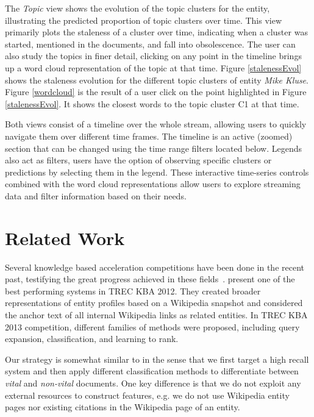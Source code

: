 \documentclass{article}
\begin{document}
The \emph{Topic} view shows the evolution of the topic clusters for the entity, illustrating the predicted proportion of topic clusters over time.
This view primarily plots the staleness of a cluster over time, indicating when a cluster was started, mentioned in the documents, and fall into obsolescence. 
The user can also study the topics in finer detail, clicking on any point in the timeline brings up a word cloud representation of the topic at that time.
Figure \ref{stalenessEvol} shows the staleness evolution for the different topic clusters of entity \emph{Mike Kluse}. 
Figure \ref{wordcloud} is the result of a user click on the point highlighted in Figure \ref{stalenessEvol}. 
It shows the closest words to the topic cluster C1 at that time.

Both views consist of a timeline over the whole stream, allowing users to quickly navigate them over different time frames.
The timeline is an active (zoomed) section that can be changed using the time range filters located below. Legends also act as filters, users have the option of observing specific clusters or predictions by selecting them in the legend.
These interactive time-series controls combined with the word cloud representations allow users to explore streaming data and filter information based on their needs.

\section{Related Work}
\label{related}

Several knowledge based acceleration competitions have been done in the recent past, testifying the great progress achieved in these fields~\cite{gross_doucet_toivonen_trec12}. 
\citet{xitong12} present one of the best performing systems in TREC KBA 2012. 
They created broader representations of entity profiles based on a Wikipedia snapshot and considered the anchor text of all internal Wikipedia links as related entities. In TREC KBA 2013 competition, different families of methods were proposed, including query expansion, classification, and learning to rank. 

Our strategy is somewhat similar to \citet{jingang13} in the sense that we first target a high recall system and then apply different classification methods to differentiate between \emph{vital} and \emph{non-vital} documents. 
One key difference is that we do not exploit any external resources to construct features, e.g. we do not use Wikipedia entity pages nor existing citations in the Wikipedia page of an entity. 
\end{document}
